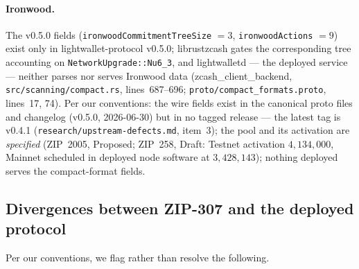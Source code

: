 \documentclass[11pt,a4paper]{article}
\theoremstyle{definition}
\begin{document}
\paragraph{Ironwood.} The v0.5.0 fields
(\texttt{ironwoodCommitmentTreeSize} $= 3$, \texttt{ironwoodActions} $= 9$)
exist only in \textsf{lightwallet-protocol} v0.5.0;
\textsf{librustzcash} gates the corresponding tree accounting on
\texttt{NetworkUpgrade::Nu6\_3}, and \textsf{lightwalletd} --- the deployed
service --- neither parses nor serves Ironwood data
(\textsf{zcash\_client\_backend}, \texttt{src/scanning/compact.rs},
lines~687--696; \texttt{proto/compact\_formats.proto}, lines~17, 74). Per
our conventions: the wire fields exist in the canonical proto files and
changelog (v0.5.0, 2026-06-30) but in no tagged release --- the latest
tag is v0.4.1 (\texttt{research/upstream-defects.md}, item~3); the pool
and its activation are \emph{specified} (ZIP~2005, Proposed; ZIP~258,
Draft: Testnet activation $4{,}134{,}000$, Mainnet scheduled in deployed
node software at $3{,}428{,}143$); nothing deployed serves the
compact-format fields.

\subsection{Divergences between ZIP-307 and the deployed protocol}%
\label{sec:sync-compact-divergences}

Per our conventions, we flag rather than resolve the following.
\end{document}
